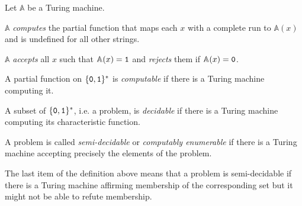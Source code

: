 \begin{defin}
    Let $\mathbb A$ be a Turing machine.

    \begin{thmlist}
        \item
          $\mathbb A$ \emph{computes} the partial function that maps each
          $x$ with a complete run to $\mathbb A(x)$ and is undefined for all
          other strings.
        \item
          $\mathbb A$ \emph{accepts} all $x$ such that
          $\mathbb A(x) = \mathtt 1$ and \emph{rejects} them if
          $\mathbb A(x) = \mathtt 0$.
        \item
          A partial function on $\lbrace \mathtt 0, \mathtt 1 \rbrace^*$ is
          \emph{computable} if there is a Turing machine computing it.
        \item
          A subset of $\lbrace \mathtt 0, \mathtt 1 \rbrace^*$, i.e. a
          problem, is \emph{decidable} if there is a Turing machine computing
          its characteristic function.
        \item
          A problem is called \emph{semi-decidable} or \emph{computably
          enumerable} if there is a Turing machine accepting precisely the
          elements of the problem.
    \end{thmlist}
\end{defin}

The last item of the definition above means that a problem is
semi-decidable if there is a Turing machine affirming membership of the
corresponding set but it might not be able to refute membership.

